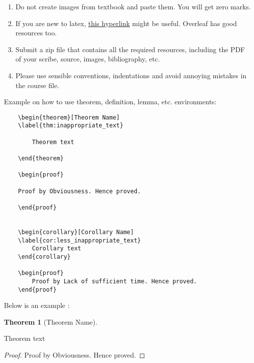 \documentclass[11.5pt, paper=a4]{article}
\theoremstyle{definition}
\newtheorem{theorem}{Theorem}[section]
\newtheorem{corollary}[theorem]{Corollary}
\numberwithin{theorem}{section}
\begin{document}
\begin{enumerate}
\item Do not create images from textbook and paste them. You will get zero marks.

\item If you are new to latex, \href{https://en.wikibooks.org/wiki/LaTeX/Mathematics}{this hyperlink} might be useful. Overleaf has good resources too.

\item Submit a zip file that contains all the required resources, including the PDF of your scribe, source, images, bibliography, etc.

\item Please use sensible conventions, indentations and avoid annoying mistakes in the course file. 

\end{enumerate}

Example on how to use theorem, definition, lemma, etc. environments:

\begin{verbatim}
    \begin{theorem}[Theorem Name]
    \label{thm:inappropriate_text}

        Theorem text

    \end{theorem}

    \begin{proof}

    Proof by Obviousness. Hence proved. 
    
    \end{proof}


    \begin{corollary}[Corollary Name]
    \label{cor:less_inappropriate_text}
        Corollary text
    \end{corollary}
    
    \begin{proof}
        Proof by Lack of sufficient time. Hence proved.
    \end{proof}

\end{verbatim}


Below is an example : 


\begin{theorem}[Theorem Name]
    \label{thm:inappropriate_text}

        Theorem text

    \end{theorem}

    \begin{proof}

    Proof by Obviousness. Hence proved. 
    
    \end{proof}
\end{document}
